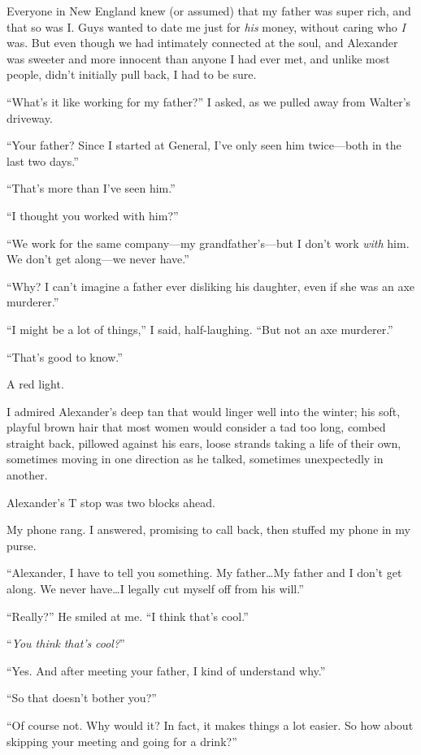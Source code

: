 Everyone in New England knew (or assumed) that my father was super rich,
and that so was I. Guys wanted to date me just for \emph{his} money,
without caring who \emph{I} was. But even though we had intimately
connected at the soul, and Alexander was sweeter and more innocent than
anyone I had ever met, and unlike most people, didn't initially pull
back, I had to be sure.

``What's it like working for my father?'' I asked, as we pulled away
from Walter's driveway.

``Your father? Since I started at General, I've only seen him
twice---both in the last two days.''

``That's more than I've seen him.''

``I thought you worked with him?''

``We work for the same company---my grandfather's---but I don't work
\emph{with} him. We don't get along---we never have.''

``Why? I can't imagine a father ever disliking his daughter, even if she
was an axe murderer.''

``I might be a lot of things,'' I said, half-laughing. ``But not an axe
murderer.''

``That's good to know.''

A red light.

I admired Alexander's deep tan that would linger well into the winter;
his soft, playful brown hair that most women would consider a tad too
long, combed straight back, pillowed against his ears, loose strands
taking a life of their own, sometimes moving in one direction as he
talked, sometimes unexpectedly in another.

Alexander's T stop was two blocks ahead.

My phone rang. I answered, promising to call back, then stuffed my phone
in my purse.

``Alexander, I have to tell you something. My father\ldots My father and
I don't get along. We never have\ldots I legally cut myself off from his
will.''

``Really?'' He smiled at me. ``I think that's cool.''

``\emph{You think} \emph{that's} \emph{cool?}''

``Yes. And after meeting your father, I kind of understand why.''

``So that doesn't bother you?''

``Of course not. Why would it? In fact, it makes things a lot easier. So
how about skipping your meeting and going for a drink?''

